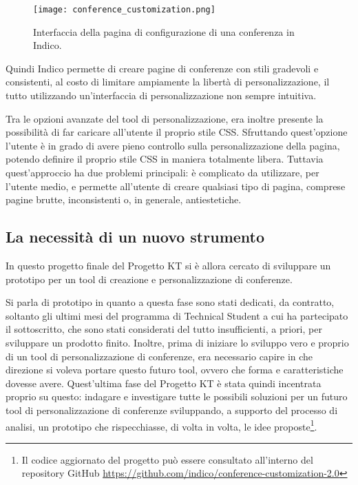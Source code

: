         \begin{figure}[h!]
            \begin{center}
        		\texttt{[image: conference\_customization.png]}
        	\end{center}
            \caption[Tool di configurazione di una conferenza in Indico]{Interfaccia della pagina di configurazione di una conferenza in Indico.}
            \label{fig:conference_customization}
        \end{figure}
        
        Quindi Indico permette di creare pagine di conferenze con stili gradevoli e consistenti, al costo di limitare ampiamente la libertà di personalizzazione, il tutto utilizzando un'interfaccia di personalizzazione non sempre intuitiva.
        
        Tra le opzioni avanzate del tool di personalizzazione, era inoltre presente la possibilità di far caricare all'utente il proprio stile \ac{CSS}. Sfruttando quest'opzione l'utente è in grado di avere pieno controllo sulla personalizzazione della pagina, potendo definire il proprio stile \ac{CSS} in maniera totalmente libera. Tuttavia quest'approccio ha due problemi principali: è complicato da utilizzare, per l'utente medio, e permette all'utente di creare qualsiasi tipo di pagina, comprese pagine brutte, inconsistenti o, in generale, antiestetiche.
        
        \subsection{La necessità di un nuovo strumento} \label{subsec:ccp;sa;necessità_nuovo_strumento}
        
            In questo progetto finale del Progetto KT si è allora cercato di sviluppare un prototipo per un tool di creazione e personalizzazione di conferenze.
            
            Si parla di prototipo in quanto a questa fase sono stati dedicati, da contratto, soltanto gli ultimi mesi del programma di Technical Student a cui ha partecipato il sottoscritto, che sono stati considerati del tutto insufficienti, a priori, per sviluppare un prodotto finito. Inoltre, prima di iniziare lo sviluppo vero e proprio di un tool di personalizzazione di conferenze, era necessario capire in che direzione si voleva portare questo futuro tool, ovvero che forma e caratteristiche dovesse avere. Quest'ultima fase del Progetto KT è stata quindi incentrata proprio su questo: indagare e investigare tutte le possibili soluzioni per un futuro tool di personalizzazione di conferenze sviluppando, a supporto del processo di analisi, un prototipo che rispecchiasse, di volta in volta, le idee proposte\footnote{Il codice aggiornato del progetto può essere consultato all'interno del repository GitHub \url{https://github.com/indico/conference-customization-2.0}}.
            
